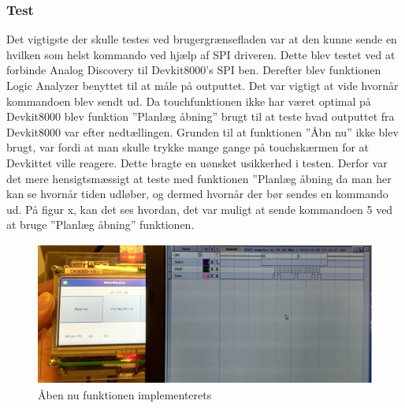 \subsubsection{Test}

Det vigtigste der skulle testes ved brugergrænsefladen var at den kunne sende en hvilken som helst kommando ved hjælp af SPI driveren. Dette blev testet ved at forbinde Analog Discovery til Devkit8000’s SPI ben. Derefter blev funktionen Logic Analyzer benyttet til at måle på outputtet. Det var vigtigt at vide hvornår kommandoen blev sendt ud. Da touchfunktionen ikke har været optimal på Devkit8000 blev funktion ”Planlæg åbning” brugt til at teste hvad outputtet fra Devkit8000 var efter nedtællingen. Grunden til at funktionen ”Åbn nu” ikke blev brugt, var fordi at man skulle trykke mange gange på touchskærmen for at Devkittet ville reagere. Dette bragte en uønsket usikkerhed i testen. Derfor var det mere hensigtsmæssigt at teste med funktionen ”Planlæg åbning da man her kan se hvornår tiden udløber, og dermed hvornår der bør sendes en kommando ud. På figur x, kan det ses hvordan, det var muligt at sende kommandoen 5 ved at bruge ”Planlæg åbning” funktionen. 

\begin{figure}[H]
\includegraphics[scale=1]{tex/TeImRe/GUI/GUI-Test/Billeder/test_GUI}
\caption{Åben nu funktionen implementerets}
\end{figure}
